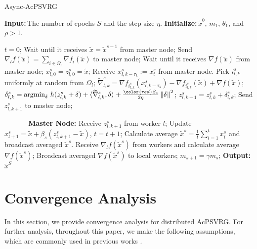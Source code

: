 \documentclass[10pt, conference, compsocconf]{IEEEtran}
\newcommand{\norm}[1]{\left\lVert#1\right\rVert}
\newcommand{\Initialize}{\textbf{Initialize:}{\,}}
\newcommand{\Input}{\textbf{Input:}{\,}}
\newcommand{\Output}{\textbf{Output:}{\,}}
\theoremstyle{definition}
\theoremstyle{remark}
\begin{document}
\begin{algorithm}[H]
\caption{Async-AcPSVRG}\label{AsyncVR-Algo}
\begin{algorithmic}
\State\Input The number of epochs $S$ and the step size $\eta$.
\State\Initialize  $\widetilde{x}^0$, $m_1$, $\theta_1$, and $\rho > 1$.

\State $t=0$;
\State Wait until it receives $\widetilde{x} = \widetilde{x}^{s-1}$ from master node;
\State  Send $\nabla_l f(\widetilde{x}) = \sum_{i\in\Omega_l}\nabla f_i(\widetilde{x})$ to master node;
\State  Wait until it receives $\nabla f(\widetilde{x})$ from master node;
 \State $x_{l,0}^s = z_{l,0}^s = \widetilde{x}$;
 \State Receive $x_{l,k-\tau_k}^s:=x_{t}^s$ from master node.
 \State Pick $i_{l,k}^s$ uniformly at random from $\Omega_l$;
 \State $\widetilde{\nabla}_{l,k}^s = \nabla f_{i_{l,k}^s}(x_{l,k-\tau_k}^s) - \nabla f_{i_{l,k}^s}(\widetilde{x}) + \nabla f(\widetilde{x})$;
 \State $\delta_{l,k}^s = \text{argmin}_{\delta}\,\,h(z_{l,k}^s+\delta)+\langle\widetilde{\nabla}_{l,k}^s,\delta\rangle + \frac{{\color{red}\beta_s}}{2\eta}\norm{\delta}^2$;
 \State $z_{l,k+1}^s = z_{l,k}^s + \delta_{l,k}^s$;
 \State Send $z_{l,k+1}^s$ to master node;
\item[{\bf ~~~~~~Master Node:}]
 \State Receive $z_{l,k+1}^s$ from worker $l$; 
  \State Update $x^s_{t+1} = \widetilde{x}+\beta_s(z_{l,k+1}^s-\widetilde{x})$, $t=t+1$;
  \EndFor
   \State Calculate average $\widetilde{x}^s = \frac{1}{t}\sum_{i=1}^{t} x_{i}^s$ and broadcast averaged $\widetilde{x}^s$. 
  \State Receive $\nabla_l f(\widetilde{x}^s)$ from workers and calculate average $\nabla f(\widetilde{x}^s)$;
  \State Broadcast averaged $\nabla f(\widetilde{x}^s)$ to local workers;
  \State $m_{s+1} = \gamma m_s$;
  \EndFor
 \State\Output $\widetilde{x}^S$
\end{algorithmic}
\end{algorithm}

\section{Convergence Analysis}
In this section, we provide convergence analysis for distributed AcPSVRG. For further analysis, throughout this paper, we make the following assumptions, which are commonly used in previous works \cite{Reddi2015, Meng2016}.
\end{document}
